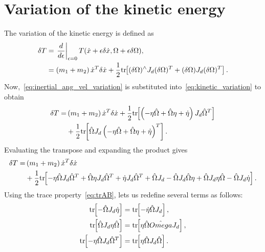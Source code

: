 \section{Variation of the kinetic energy}\label{sec:inertial_kinetic_energy_variation}
The variation of the kinetic energy is defined as
\begin{align}
    \delta T &= \left. \frac{d }{d \epsilon}\right|_{\epsilon=0} T(\dot{x} + \epsilon \delta \dot{x}, \Omega + \epsilon \delta \Omega), \nonumber\\
             &=   \left( m_1 + m_2 \right) \dot{x}^T \delta \dot{x} + \frac{1}{2} \mathrm{tr}\negthickspace\left[  (\delta \Omega )^\wedge J_d (\delta \Omega )^T + (\delta \Omega)J_d (\delta \Omega)^T \right]\label{eq:kinetic_variation}.
\end{align}
Now,~\cref{eq:inertial_ang_vel_variation} is substituted into~\cref{eq:kinetic_variation} to obtain
\begin{align*}
    \delta T =&  \left( m_1 + m_2 \right) \dot{x}^T \delta \dot{x} + \frac{1}{2} \mathrm{tr}\negthickspace\left[ \left( -\eta \hat{\Omega} + \hat{\Omega} \eta + \dot{\eta} \right) J_d \hat{\Omega}^T \right] \nonumber \\
              &+ \frac{1}{2} \mathrm{tr}\negthickspace\left[ \hat{\Omega} J_d \left( -\eta \hat{\Omega} + \hat{\Omega} \eta + \dot{\eta} \right)^T \right] .
\end{align*}
Evaluating the transpose and expanding the product gives
\begin{align*}
    \delta T =&  \left( m_1 + m_2 \right) \dot{x}^T \delta \dot{x} \\
              &+ \frac{1}{2} \mathrm{tr}\negthickspace\left[  -\eta \hat{\Omega} J_d \hat{\Omega}^T + \hat{\Omega} \eta J_d \hat{\Omega}^T + \dot{\eta} J_d \hat{\Omega}^T + \hat{\Omega} J_d -\hat{\Omega} J_d \hat{\Omega} \eta + \hat{\Omega} J_d \eta \hat{\Omega} - \hat{\Omega} J_d \dot{\eta} \right].
\end{align*}
Using the trace property~\cref{eq:trAB}, lets us redefine several terms as follows:
\begin{subequations}\label{eq:inertial_kinetic_energy_substitutions}
\begin{align}
    \mathrm{tr}\negthickspace\left[ -\hat{\Omega} J_d \dot{\eta} \right] &= \mathrm{tr}\negthickspace\left[ - \dot{\eta} \hat{\Omega} J_d \right] , \\
    \mathrm{tr}\negthickspace\left[ \hat{\Omega} J_d \eta \hat{\Omega} \right] &= \mathrm{tr}\negthickspace\left[ \eta \hat{\Omega} \hat{Omega} J_d \right] , \\
    \mathrm{tr}\negthickspace\left[ -\eta \hat{\Omega} J_d \hat{\Omega}^T \right] &= \mathrm{tr}\negthickspace\left[ \eta \hat{\Omega} J_d \hat{\Omega} \right] .
\end{align}
\end{subequations}     
